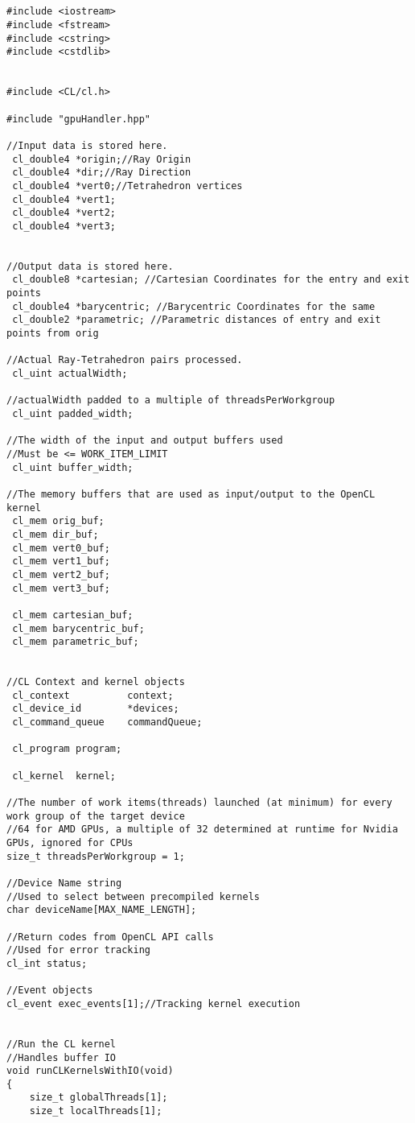 \begin{verbatim}


#include <iostream>
#include <fstream>
#include <cstring>
#include <cstdlib>


#include <CL/cl.h>

#include "gpuHandler.hpp"

//Input data is stored here.
 cl_double4 *origin;//Ray Origin
 cl_double4 *dir;//Ray Direction
 cl_double4 *vert0;//Tetrahedron vertices
 cl_double4 *vert1;
 cl_double4 *vert2;
 cl_double4 *vert3;


//Output data is stored here.
 cl_double8 *cartesian; //Cartesian Coordinates for the entry and exit points
 cl_double4 *barycentric; //Barycentric Coordinates for the same
 cl_double2 *parametric; //Parametric distances of entry and exit points from orig

//Actual Ray-Tetrahedron pairs processed. 
 cl_uint actualWidth;

//actualWidth padded to a multiple of threadsPerWorkgroup
 cl_uint padded_width;

//The width of the input and output buffers used
//Must be <= WORK_ITEM_LIMIT
 cl_uint buffer_width;
 
//The memory buffers that are used as input/output to the OpenCL kernel
 cl_mem orig_buf;
 cl_mem dir_buf;
 cl_mem vert0_buf;
 cl_mem vert1_buf;
 cl_mem vert2_buf;
 cl_mem vert3_buf;

 cl_mem cartesian_buf;
 cl_mem barycentric_buf;
 cl_mem parametric_buf;


//CL Context and kernel objects
 cl_context          context;
 cl_device_id        *devices;
 cl_command_queue    commandQueue;

 cl_program program;

 cl_kernel  kernel;
 
//The number of work items(threads) launched (at minimum) for every work group of the target device
//64 for AMD GPUs, a multiple of 32 determined at runtime for Nvidia GPUs, ignored for CPUs
size_t threadsPerWorkgroup = 1;

//Device Name string
//Used to select between precompiled kernels
char deviceName[MAX_NAME_LENGTH];

//Return codes from OpenCL API calls
//Used for error tracking
cl_int status;

//Event objects
cl_event exec_events[1];//Tracking kernel execution

       
//Run the CL kernel
//Handles buffer IO
void runCLKernelsWithIO(void)
{
	size_t globalThreads[1];
	size_t localThreads[1];
		

\end{verbatim}
